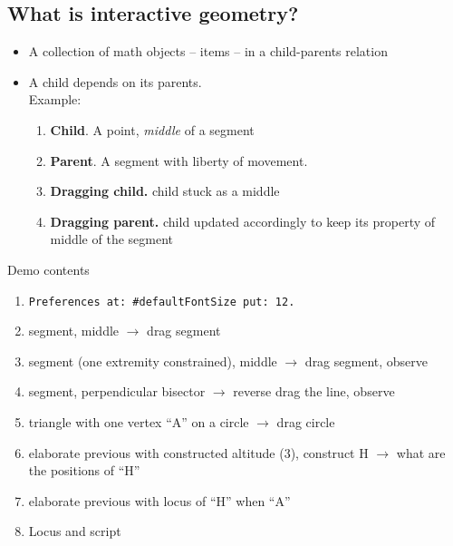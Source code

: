 \documentclass{beamer}
\newcommand{\cmark}{\text{\ding{51}}}
\newcommand{\xmark}{\text{\ding{55}}}
\begin{document}
\subsection{What is interactive geometry?}
\begin{frame}
  \begin{itemize}
  \item A collection of math objects -- items -- in a child-parents
    relation
  \item A child depends on its parents. \\
    Example:
    \begin{enumerate}
    \item \textbf{Child}. A point, \emph{middle} of a segment
    \item \textbf{Parent}. A segment with liberty of movement.
    \item \textbf{Dragging child.} \textcolor{red}{\xmark} child stuck as a middle
    \item \textbf{Dragging parent.} \textcolor{green}{\cmark} child
      updated accordingly to keep its property of middle of the
      segment
    \end{enumerate}
  \end{itemize}
\end{frame}
%
\begin{frame}
  \begin{center}
  \end{center}
\end{frame}
%
\begin{frame}{Demo contents}
  \begin{enumerate}
  \item \texttt{Preferences at: \#defaultFontSize put: 12.}
  \item segment, middle  $\rightarrow$ drag segment
  \item segment (one extremity constrained), middle $\rightarrow$ drag segment, observe
  \item segment, perpendicular bisector $\rightarrow$ reverse drag the line, observe
  \item triangle with one vertex ``A'' on a circle $\rightarrow$ drag circle
  \item elaborate previous with constructed altitude (3), construct H
    $\rightarrow$ what are the positions of ``H''
  \item elaborate previous with locus of ``H'' when ``A''
  \item Locus and script
  \end{enumerate}
\end{frame}
\end{document}
